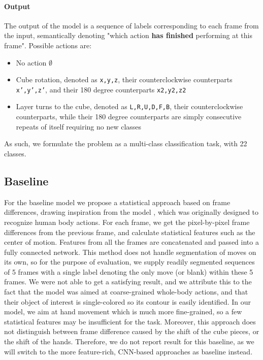 \documentclass[10pt,twocolumn,letterpaper]{article}
\begin{document}
\paragraph{Output} The output of the model is a sequence of labels corresponding to each frame from the input, semantically denoting "which action \textbf{has finished} performing at this frame". Possible actions are:
\begin{itemize}
    \item No action $\emptyset$
    \item Cube rotation, denoted as \texttt{x,y,z}, their counterclockwise counterparts \texttt{x',y',z'}, and their 180 degree counterparts \texttt{x2,y2,z2}
    \item Layer turns to the cube, denoted as \texttt{L,R,U,D,F,B}, their counterclockwise counterparts, while their 180 degree counterparts are simply consecutive repeats of itself requiring no new classes
\end{itemize}
As such, we formulate the problem as a multi-class classification task, with 22 classes.

\subsection{Baseline}

For the baseline model we propose a statistical approach based on frame differences, drawing inspiration from the model \cite{sadek2012fast}, which was originally designed to recognize human body actions.
For each frame, we get the pixel-by-pixel frame differences from the previous frame, and calculate statistical features such as the center of motion. Features from all the frames are concatenated and passed into a fully connected network. This method does not handle segmentation of moves on its own, so for the purpose of evaluation, we supply readily segmented sequences of 5 frames with a single label denoting the only move (or blank) within these 5 frames. We were not able to get a satisfying result, and we attribute this to the fact that the model was aimed at coarse-grained whole-body actions, and that their object of interest is single-colored so its contour is easily identified. In our model, we aim at hand movement which is much more fine-grained, so a few statistical features may be insufficient for the task. Moreover, this approach does not distinguish between frame difference caused by the shift of the cube pieces, or the shift of the hands. Therefore, we do not report result for this baseline, as we will switch to the more feature-rich, CNN-based approaches as baseline instead.
\end{document}

